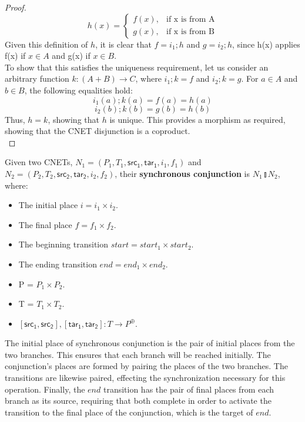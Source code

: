 \begin {proof}
  \begin{equation}
    h(x)=
    \begin{cases}
      f(x), & \text{if x is from A}\\
      g(x), & \text{if x is from B}
    \end{cases}
  \end{equation}
Given this definition of $h$, it is clear that $f = i_1;h$ and $g = i_2;h$, since h(x) applies f(x) if $x \in A$ and g(x) if $x \in B$.\\
To show that this satisfies the uniqueness requirement, let us consider an arbitrary function $k : (A+B) \to C$, where $i_1;k = f$ and $i_2;k = g$. For $a\in A$ and $b\in B$, the following equalities hold:\\ 
\begin{equation}
i_1(a);k(a) = f(a) = h(a) 
\end {equation}
\begin{equation}
i_2(b);k(b) = g(b) = h(b)
\end{equation}
Thus, $h = k$, showing that $h$ is unique. 
This provides a morphism as required, showing that the CNET disjunction is a coproduct.  
\bigskip\\
\end{proof}
\begin{definition}
  \label{def:SYNC-AND-PN}
   Given two CNETs, $N_1= (P_1, T_1, \mathsf{src_1}, \mathsf{tar_1}, i_1, f_1)$ and $N_2= (P_2, T_2, \mathsf{src_2}, \mathsf{tar_2}, i_2, f_2)$, their \textbf{synchronous conjunction} is $N_1 \talloblong N_2$, where: 
\begin{itemize}
\item The initial place $i = i_1 \times i_2$.
\item The final place $f = f_1 \times f_2$.
\item The beginning transition $start = start_1 \times start_2$. 
\item The ending transition $end = end_1 \times end_2$.
\item P = $P_1 \times P_2$.
\item T = $T_1 \times T_2$.
\item $[\mathsf{src_1}, \mathsf{src_2}], [\mathsf{tar_1}, \mathsf{tar_2}]: T\to P^\oplus$. 
\end{itemize}
The initial place of synchronous conjunction is the pair of initial places from the two branches. This ensures that each branch will be reached initially. The conjunction's places are formed by pairing the places of the two branches. The transitions are likewise paired, effecting the synchronization necessary for this operation. Finally, the $end$ transition has the pair of final places from each branch as its source, requiring that both complete in order to activate the transition to the final place of the conjunction, which is the target of $end$. 
\end{definition}
